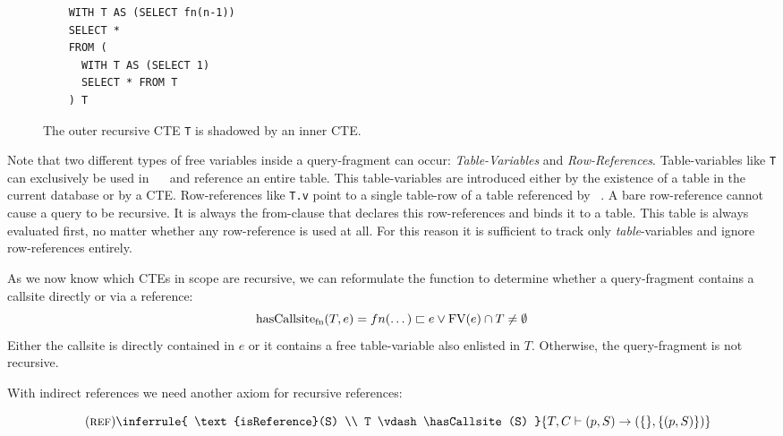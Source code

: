 \begin{wrapfigure}{r}{0.4\textwidth}
    \begin{verbatim}
    WITH T AS (SELECT fn(n-1))
    SELECT *
    FROM (
      WITH T AS (SELECT 1)
      SELECT * FROM T
    ) T
    \end{verbatim}
    \caption{The outer recursive CTE \texttt{T} is shadowed by an inner CTE.}
    \label{lst:indirect_callsite_ref}
\end{wrapfigure}

Note that two different types of free variables inside a query-fragment can occur: \textit{Table-Variables} and \textit{Row-References}. Table-variables like \texttt{T} can exclusively be used in ~\FROM~ and reference an entire table. This table-variables are introduced either by the existence of a table in the current database or by a CTE. Row-references like \texttt{T.v} point to a single table-row of a table referenced by ~\FROM. A bare row-reference cannot cause a query to be recursive. It is always the from-clause that declares this row-references and binds it to a table. This table is always evaluated first, no matter whether any row-reference is used at all. For this reason it is sufficient to track only \textit{table}-variables and ignore row-references entirely.

As we now know which CTEs in scope are recursive, we can reformulate the function to determine whether a query-fragment contains a callsite directly or via a reference:
$$\operatorname{\text{hasCallsite}_{fn}}(T, e) = fn(\dots) \sqsubset e \lor \operatorname{\text{\rm FV}}(e) \cap T \neq \emptyset$$
Either the callsite is directly contained in $e$ or it contains a free table-variable also enlisted in $T$. Otherwise, the query-fragment is not recursive.

With indirect references we need another axiom for recursive references:

$$\quad(\textsc{ref})\inferrule{
   \text{isReference}(S) \\
   T \vdash \hasCallsite(S)
}{
    T, C \vdash (p, S) \rightarrow (\{\}, \{(p, S)\})
}$$



